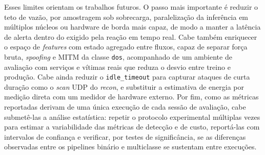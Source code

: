 \documentclass[12pt]{article}
\begin{document}
Esses limites orientam os trabalhos futuros. O passo mais importante é reduzir o
teto de vazão, por amostragem sob sobrecarga, paralelização da inferência em
múltiplos núcleos ou hardware de borda mais capaz, de modo a manter a latência de
alerta dentro do exigido pela reação em tempo real. Cabe também enriquecer o
espaço de \textit{features} com estado agregado entre fluxos, capaz de separar
força bruta, \textit{spoofing} e MITM da classe \texttt{dos}, acompanhado de um
ambiente de avaliação com serviços e vítimas reais que reduza o desvio entre
treino e produção. Cabe ainda reduzir o
\texttt{idle\_timeout} para capturar ataques de curta duração como o \textit{scan}
UDP do \textit{recon}, e substituir a estimativa de energia por medição direta
com um medidor de hardware externo. Por fim, como as métricas reportadas
derivam de uma única execução de cada sessão de avaliação, cabe submetê-las a
análise estatística: repetir o protocolo experimental múltiplas vezes para
estimar a variabilidade das métricas de detecção e de custo, reportá-las com
intervalos de confiança e verificar, por testes de significância, se as
diferenças observadas entre os pipelines binário e multiclasse se sustentam
entre execuções.



\end{document}
